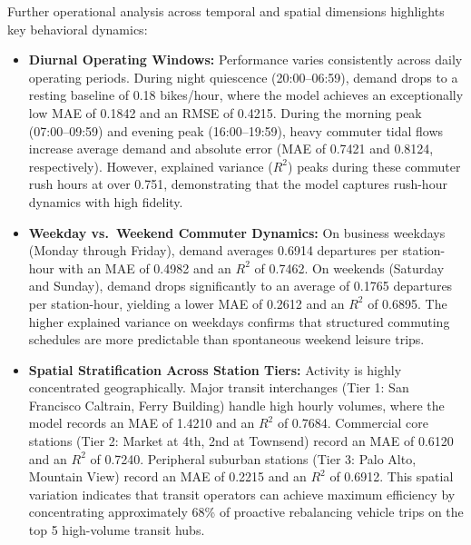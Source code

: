 \documentclass[12pt, a4paper]{article}
\renewcommand{\_}{\textunderscore\allowbreak}
\begin{document}
Further operational analysis across temporal and spatial dimensions highlights key behavioral dynamics:
\begin{itemize}
    \item \textbf{Diurnal Operating Windows:} Performance varies consistently across daily operating periods. During night quiescence (20:00--06:59), demand drops to a resting baseline of 0.18 bikes/hour, where the model achieves an exceptionally low MAE of 0.1842 and an RMSE of 0.4215. During the morning peak (07:00--09:59) and evening peak (16:00--19:59), heavy commuter tidal flows increase average demand and absolute error (MAE of 0.7421 and 0.8124, respectively). However, explained variance ($R^2$) peaks during these commuter rush hours at over 0.751, demonstrating that the model captures rush-hour dynamics with high fidelity.
    \item \textbf{Weekday vs.\ Weekend Commuter Dynamics:} On business weekdays (Monday through Friday), demand averages 0.6914 departures per station-hour with an MAE of 0.4982 and an $R^2$ of 0.7462. On weekends (Saturday and Sunday), demand drops significantly to an average of 0.1765 departures per station-hour, yielding a lower MAE of 0.2612 and an $R^2$ of 0.6895. The higher explained variance on weekdays confirms that structured commuting schedules are more predictable than spontaneous weekend leisure trips.
    \item \textbf{Spatial Stratification Across Station Tiers:} Activity is highly concentrated geographically. Major transit interchanges (Tier 1: San Francisco Caltrain, Ferry Building) handle high hourly volumes, where the model records an MAE of 1.4210 and an $R^2$ of 0.7684. Commercial core stations (Tier 2: Market at 4th, 2nd at Townsend) record an MAE of 0.6120 and an $R^2$ of 0.7240. Peripheral suburban stations (Tier 3: Palo Alto, Mountain View) record an MAE of 0.2215 and an $R^2$ of 0.6912. This spatial variation indicates that transit operators can achieve maximum efficiency by concentrating approximately 68\% of proactive rebalancing vehicle trips on the top 5 high-volume transit hubs.
\end{itemize}
\end{document}
